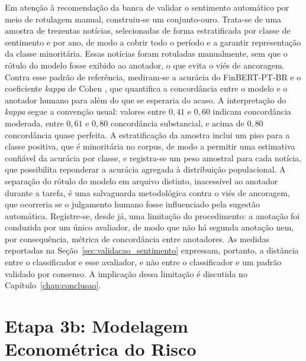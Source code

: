 Em atenção à recomendação da banca de validar o sentimento automático por meio de rotulagem manual, construiu-se um conjunto-ouro. Trata-se de uma amostra de trezentas notícias, selecionadas de forma estratificada por classe de sentimento e por ano, de modo a cobrir todo o período e a garantir representação da classe minoritária. Essas notícias foram rotuladas manualmente, sem que o rótulo do modelo fosse exibido ao anotador, o que evita o viés de ancoragem. Contra esse padrão de referência, mediram-se a acurácia do FinBERT-PT-BR e o coeficiente \textit{kappa} de Cohen \cite{cohen_coefficient_1960}, que quantifica a concordância entre o modelo e o anotador humano para além do que se esperaria do acaso. A interpretação do \textit{kappa} segue a convenção usual: valores entre $0{,}41$ e $0{,}60$ indicam concordância moderada, entre $0{,}61$ e $0{,}80$ concordância substancial, e acima de $0{,}80$ concordância quase perfeita. A estratificação da amostra inclui um piso para a classe positiva, que é minoritária no corpus, de modo a permitir uma estimativa confiável da acurácia por classe, e registra-se um peso amostral para cada notícia, que possibilita reponderar a acurácia agregada à distribuição populacional. A separação do rótulo do modelo em arquivo distinto, inacessível ao anotador durante a tarefa, é uma salvaguarda metodológica contra o viés de ancoragem, que ocorreria se o julgamento humano fosse influenciado pela sugestão automática. Registre-se, desde já, uma limitação do procedimento: a anotação foi conduzida por um único avaliador, de modo que não há segunda anotação nem, por consequência, métrica de concordância entre anotadores. As medidas reportadas na Seção~\ref{sec:validacao_sentimento} expressam, portanto, a distância entre o classificador e esse avaliador, e não entre o classificador e um padrão validado por consenso. A implicação dessa limitação é discutida no Capítulo~\ref{chap:conclusao}.

\section{Etapa 3b: Modelagem Econométrica do Risco}

